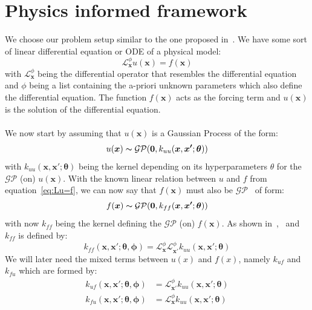 \documentclass{article}
\begin{document}
\section{Physics informed framework}
We choose our problem setup similar to the one proposed in~\cite{RAISSI}. We
have some sort of linear differential equation or ODE of a physical model:
\begin{equation}
    \label{eq:Lu=f}
    \mathcal{L}_{\bm{x}}^\phi u(\bm{x}) = f(\bm{x})
\end{equation}
with $\mathcal{L}_{\bm{x}}^\phi$ being the differential operator that resembles the differential equation and $\phi$ being a list containing the a-priori unknown parameters which also define the differential equation. The function $f(\bm{x})$ acts as the forcing term and $u(\bm{x})$ is the solution of the differential equation.  \\
\\
We now start by assuming that $u(\bm{x})$ is a Gaussian Process of the form:
\begin{equation}
    u(\bm{x}) \thicksim \mathcal{G}\mathcal{P}(\bm{0},k_{uu}(\bm{x},\bm{x'};\bm{\theta}))
\end{equation}
with $k_{uu}(\bm{x},\bm{x'};\bm{\theta})$ being the kernel depending on its hyperparameters $\theta$ for the $\mathcal{G}\mathcal{P}$ (on) $u(\bm{x})$. With the known linear relation between $u$ and $f$ from equation~\ref{eq:Lu=f}, we can now say that $f(\bm{x})$ must also be $\mathcal{G}\mathcal{P}$~\cite{RasmussenCarlEdward} of form:
\begin{equation}
    f(\bm{x}) \thicksim \mathcal{G}\mathcal{P}(\bm{0},k_{ff}(\bm{x},\bm{x'};\bm{\theta}))
\end{equation}
with now $k_{ff}$ being the kernel defining the $\mathcal{G}\mathcal{P}$ (on) $f(\bm{x})$. As shown in~\cite{garnett_2023_full},~\cite{Särkkä} and~\cite{RAISSI} $k_{ff}$ is defined by:
\begin{equation}
    k_{ff}(\bm{x},\bm{x'};\bm{\theta}, \bm{\phi}) = \mathcal{L}_{\bm{x}}^\phi \mathcal{L}_{\bm{x'}}^\phi k_{uu}(\bm{x},\bm{x'};\bm{\theta})
\end{equation}
We will later need the mixed terms between $u(x)$ and $f(x)$, namely $k_{uf}$ and $k_{fu}$ which are formed by:
\begin{equation}
    \begin{aligned}
        k_{uf}(\bm{x,x'};\bm{\theta,\phi}) & = \mathcal{L}_{\bm{x'}}^\phi k_{uu}(\bm{x},\bm{x'};\bm{\theta}) \\
        k_{fu}(\bm{x,x'};\bm{\theta,\phi}) & = \mathcal{L}_{\bm{x}}^\phi k_{uu}(\bm{x},\bm{x'};\bm{\theta})
    \end{aligned}
\end{equation}
\end{document}
